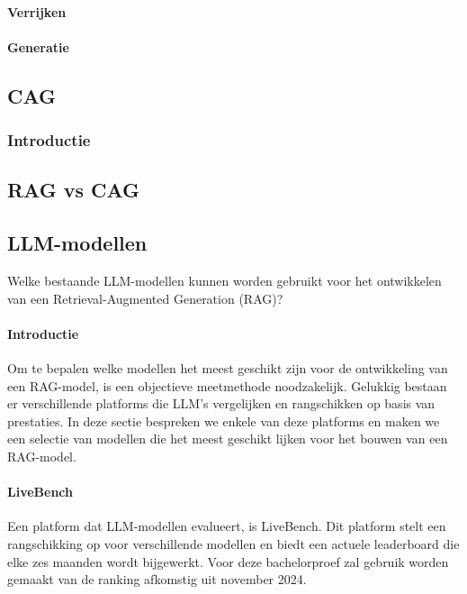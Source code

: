     \paragraph{Verrijken}
    \paragraph{Generatie}
        
    
    
    
    \subsection{CAG}
    \subsubsection{Introductie}
    
    \subsection{RAG vs CAG}
    
    
    \subsection{LLM-modellen}
    Welke bestaande LLM-modellen kunnen worden gebruikt voor het ontwikkelen van een Retrieval-Augmented Generation (RAG)? 
    
    
    \paragraph{Introductie}
    Om te bepalen welke modellen het meest geschikt zijn voor de ontwikkeling van een RAG-model, is een objectieve meetmethode noodzakelijk. Gelukkig bestaan er verschillende platforms die LLM's vergelijken en rangschikken op basis van prestaties. In deze sectie bespreken we enkele van deze platforms en maken we een selectie van modellen die het meest geschikt lijken voor het bouwen van een RAG-model.
    
    
    \paragraph{LiveBench} 
    Een platform dat LLM-modellen evalueert, is LiveBench. Dit platform stelt een rangschikking op voor verschillende modellen en biedt een actuele leaderboard die elke zes maanden wordt bijgewerkt. Voor deze bachelorproef zal gebruik worden gemaakt van de ranking afkomstig uit november 2024.
    
